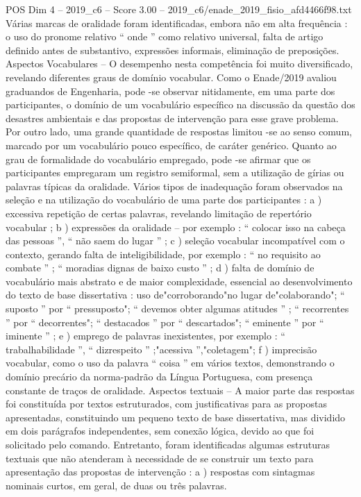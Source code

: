 \begin{textsample}{POS Dim 4 – 2019\_c6 – Score 3.00 – 2019\_c6/enade\_2019\_fisio\_afd4466f98.txt}
Várias marcas de oralidade foram identificadas, embora não em alta frequência : o uso do pronome relativo “ onde ” como relativo universal, falta de artigo definido antes de substantivo, expressões informais, eliminação de preposições.
Aspectos Vocabulares – O desempenho nesta competência foi muito diversificado, revelando diferentes graus de domínio vocabular.
Como o Enade/2019 avaliou graduandos de Engenharia, pode -se observar nitidamente, em uma parte dos participantes, o domínio de um vocabulário específico na discussão da questão dos desastres ambientais e das propostas de intervenção para esse grave problema.
Por outro lado, uma grande quantidade de respostas limitou -se ao senso comum, marcado por um vocabulário pouco específico, de caráter genérico.
Quanto ao grau de formalidade do vocabulário empregado, pode -se afirmar que os participantes empregaram um registro semiformal, sem a utilização de gírias ou palavras típicas da oralidade.
Vários tipos de inadequação foram observados na seleção e na utilização do vocabulário de uma parte dos participantes : a ) excessiva repetição de certas palavras, revelando limitação de repertório vocabular ; b ) expressões da oralidade – por exemplo : “ colocar isso na cabeça das pessoas ”, “ não saem do lugar ” ; c ) seleção vocabular incompatível com o contexto, gerando falta de inteligibilidade, por exemplo : “ no requisito ao combate ” ; “ moradias dignas de baixo custo ” ; d ) falta de domínio de vocabulário mais abstrato e de maior complexidade, essencial ao desenvolvimento do texto de base dissertativa : uso de"corroborando"no lugar de"colaborando"; “ suposto ” por “ pressuposto"; “ devemos obter algumas atitudes ” ; “ recorrentes ” por “ decorrentes"; “ destacados ” por “ descartados"; “ eminente ” por “ iminente ” ; e ) emprego de palavras inexistentes, por exemplo : “ trabalhabilidade ”, “ dizrespeito ” ;"acessiva ”,"coletagem"; f ) imprecisão vocabular, como o uso da palavra “ coisa ” em vários textos, demonstrando o domínio precário da norma-padrão da Língua Portuguesa, com presença constante de traços de oralidade.
Aspectos textuais – A maior parte das respostas foi constituída por textos estruturados, com justificativas para as propostas apresentadas, constituindo um pequeno texto de base dissertativa, mas dividido em dois parágrafos independentes, sem conexão lógica, devido ao que foi solicitado pelo comando.
Entretanto, foram identificadas algumas estruturas textuais que não atenderam à necessidade de se construir um texto para apresentação das propostas de intervenção : a ) respostas com sintagmas nominais curtos, em geral, de duas ou três palavras.

\end{textsample}
